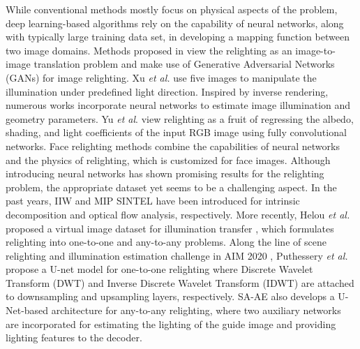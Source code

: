 \documentclass[final]{cvpr}
\begin{document}
While conventional methods mostly focus on physical aspects of the problem, deep learning-based algorithms rely on the capability of neural networks, along with typically large training data set, in developing a mapping function between two image domains. Methods proposed in \cite{40,41} view the relighting as an image-to-image translation problem and make use of Generative Adversarial Networks (GANs) for image relighting. Xu \emph{et al.} \cite{42} use five images to manipulate the illumination under predefined light direction. Inspired by inverse rendering, numerous works incorporate neural networks to estimate image illumination and geometry parameters. Yu \emph{et al}. \cite{21,3} view relighting as a fruit of regressing the albedo, shading, and light coefficients of the input RGB image using fully convolutional networks. Face relighting methods \cite{12,7,15} combine the capabilities of neural networks and the physics of relighting, which is customized for face images. Although introducing neural networks has shown promising results for the relighting problem, the appropriate dataset yet seems to be a challenging aspect. In the past years, IIW \cite{44} and MIP SINTEL \cite{43} have been introduced for intrinsic decomposition and  optical flow analysis, respectively. More recently, Helou \emph{et al.} proposed a virtual image dataset for illumination transfer \cite{13}, which formulates relighting into one-to-one and any-to-any problems. Along the line of scene relighting and illumination estimation challenge in AIM 2020 \cite{1}, Puthessery \emph{et al.} \cite{14} propose a U-net \cite{45} model for one-to-one relighting where Discrete Wavelet Transform (DWT) and Inverse Discrete Wavelet Transform (IDWT) are attached to downsampling and upsampling layers, respectively. SA-AE \cite{46} also develops a U-Net-based architecture for any-to-any relighting, where two auxiliary networks are incorporated for estimating the lighting of the guide image and providing lighting features to the decoder.
\end{document}
